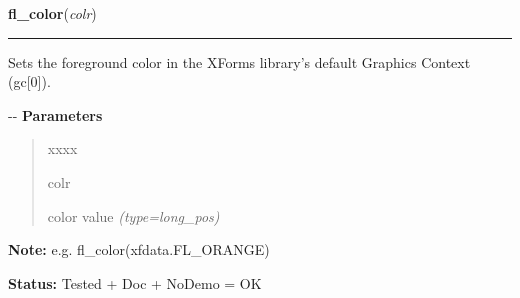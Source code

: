     \label{xformslib:flbasic:fl_color}

    \vspace{0.5ex}

\hspace{.8\funcindent}\begin{boxedminipage}{\funcwidth}

    \raggedright \textbf{fl\_color}(\textit{colr})

    \vspace{-1.5ex}

    \rule{\textwidth}{0.5\fboxrule}
\setlength{\parskip}{2ex}

Sets the foreground color in the XForms library's default Graphics
Context (gc{[}0{]}).

-{}-
\setlength{\parskip}{1ex}
      \textbf{Parameters}
      \vspace{-1ex}

      \begin{quote}
        \begin{Ventry}{xxxx}

          \item[colr]


color value
            {\it (type=long\_pos)}

        \end{Ventry}

      \end{quote}

\textbf{Note:} 
e.g. fl\_color(xfdata.FL\_ORANGE)


\textbf{Status:} 
Tested + Doc + NoDemo = OK


    \end{boxedminipage}

    \label{xformslib:flbasic:fl_bk_color}

    \vspace{0.5ex}


